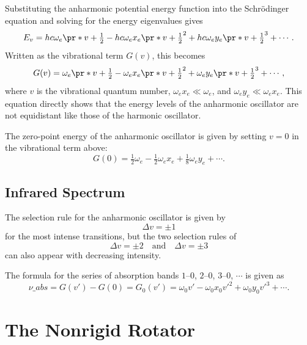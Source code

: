 \documentclass[11pt, twoside, fleqn]{report}
\newcommand{\dash}{\text{--}}
\begin{document}
Substituting the anharmonic potential energy function into the Schr\"odinger equation and solving for the energy eigenvalues gives
\begin{equation*}
    E_v = hc\omega_e\pr*{v + \tfrac{1}{2}} - hc\omega_ex_e\pr*{v + \tfrac{1}{2}}^2 + hc\omega_ey_e\pr*{v + \tfrac{1}{2}}^3 + \dotsb.
\end{equation*}
Written as the vibrational term $G(v)$, this becomes
\begin{equation*}
    G(v) = \omega_e\pr*{v + \tfrac{1}{2}} - \omega_ex_e\pr*{v + \tfrac{1}{2}}^2 + \omega_ey_e\pr*{v + \tfrac{1}{2}}^3 + \dotsb,
\end{equation*}
where $v$ is the vibrational quantum number, $\omega_ex_e \ll \omega_e$, and $\omega_ey_e \ll \omega_ex_e$. This equation directly shows that the energy levels of the anharmonic oscillator are not equidistant like those of the harmonic oscillator.

The zero-point energy of the anharmonic oscillator is given by setting $v = 0$ in the vibrational term above:
\begin{equation*}
    G(0) = \tfrac{1}{2}\omega_e - \tfrac{1}{2}\omega_ex_e + \tfrac{1}{8}\omega_ey_e + \dotsb.
\end{equation*}

\section{Infrared Spectrum}
\label{s:infrared_spectrum}

The selection rule for the anharmonic oscillator is given by
\begin{equation*}
    \Delta{}v = \pm 1
\end{equation*}
for the most intense transitions, but the two selection rules of
\begin{equation*}
    \Delta{}v = \pm 2 \quad\text{and}\quad \Delta{}v = \pm 3
\end{equation*}
can also appear with decreasing intensity.

The formula for the series of absorption bands $1\dash0$, $2\dash0$, $3\dash0$, $\dotsb$ is given as
\begin{equation*}
    \nu\_{abs} = G(v') - G(0) = G_0(v') = \omega_0v' - \omega_0x_0v'^2 + \omega_0y_0v'^3 + \dotsb.
\end{equation*}

\chapter{The Nonrigid Rotator}
\label{c:the_nonrigid_rotator}
\end{document}
